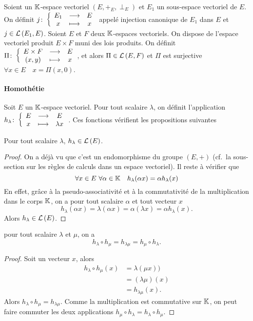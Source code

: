 Soient un \(\mathbb{K}\)-espace vectoriel \((E,+_E,\perp_E)\) et \(E_1\) un sous-espace 
vectoriel de \(E\). On définit \(j\colon\left\{\begin{array}{ccc}E_1 & \longrightarrow &E\\x & \longmapsto & x\end{array}\right.\) appelé injection 
canonique de \(E_1\) dans \(E\) et \(j \in \mathcal{L}\left(E_1,E\right)\). Soient \(E\) et \(F\) 
deux \(\mathbb{K}\)-espaces vectoriels. On dispose de l'espace vectoriel produit \(E 
\times F\) muni des lois produits. On définit \(\Pi\colon\left\{\begin{array}{ccc}E\times 
F & \longrightarrow &E\\(x,y) & \longmapsto & x\end{array}\right.\), et alors \(\Pi \in \mathcal{L}\left(E,F\right)\) et \(\Pi\) est surjective 
\(\forall x \in E \quad x=\Pi(x,0)\).

\paragraph{Homothétie}
Soit \(E\) un \(\mathbb{K}\)-espace vectoriel. Pour tout scalaire \(\lambda\), on 
définit l'application \(h_\lambda\colon\left\{\begin{array}{ccc}E & \longrightarrow &E\\x & \longmapsto & \lambda x\end{array}\right.\). Ces 
fonctions vérifient les propositions suivantes
\begin{prop}
  Pour tout scalaire \(\lambda\), \(h_\lambda \in \mathcal{L}\left(E\right)\).
\end{prop}
\begin{proof}
  On a déjà vu que c'est un endomorphisme du groupe \((E,+)\) (cf.\ la 
  sous-section sur les règles de calculs dans un espace vectoriel). Il reste à 
  vérifier que
  \begin{equation}
    \forall x \in E \ \forall \alpha \in \mathbb{K} \quad h_\lambda(\alpha x)=\alpha 
    h_\lambda(x)
  \end{equation}
  En effet, grâce à la pseudo-associativité et à la commutativité de la 
  multiplication dans le corps \(\mathbb{K}\), on a pour tout scalaire \(\alpha\) et 
  tout vecteur \(x\)
  \begin{equation}
    h_\lambda(\alpha x) = \lambda (\alpha x)= \alpha (\lambda x)=\alpha 
    h_\lambda(x).
  \end{equation}
  Alors \(h_\lambda \in \mathcal{L}\left(E\right)\).
\end{proof}
\begin{prop}
  pour tout scalaire \(\lambda\) et \(\mu\), on a
  \begin{equation}
    h_\lambda \circ h_\mu = h_{\lambda\mu}=h_\mu \circ h_\lambda.
  \end{equation}
\end{prop}
\begin{proof}
  Soit un vecteur \(x\), alors
  \begin{align}
    h_\lambda \circ h_\mu(x)&= \lambda(\mu x)) \\
    &=(\lambda\mu)(x)\\
    &= h_{\lambda\mu}(x).
  \end{align}
  Alors \(h_\lambda \circ h_\mu = h_{\lambda\mu}\). Comme la multiplication est 
  commutative sur \(\mathbb{K}\), on peut faire commuter les deux applications \(h_\mu 
  \circ h_\lambda=h_\lambda \circ h_\mu \).
\end{proof}
